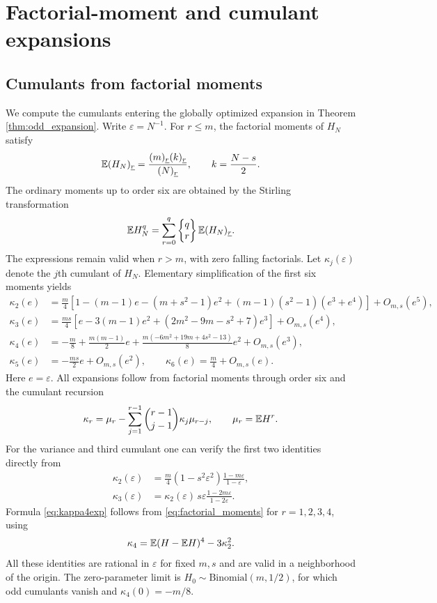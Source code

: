 \section{Factorial-moment and cumulant expansions}\label{app:cumulants}
\subsection{Cumulants from factorial moments}\label{sec:cumulants_odd}
We compute the cumulants entering the globally optimized expansion in Theorem \ref{thm:odd_expansion}. Write $\varepsilon=N^{-1}$. For $r\le m$, the factorial moments of $H_N$ satisfy
\begin{equation}\label{eq:factorial_moments}
 \mathbb E(H_N)_{\underline r}
 =\frac{(m)_{\underline r}(k)_{\underline r}}
 {(N)_{\underline r}},\qquad k=\frac{N-s}{2}.
\end{equation}
The ordinary moments up to order six are obtained by the Stirling transformation
\[
 \mathbb E H_N^q=\sum_{r=0}^q\left\{\begin{matrix}q\\r\end{matrix}\right\}
 \mathbb E(H_N)_{\underline r}.
\]
The expressions remain valid when $r>m$, with zero falling factorials. Let $\kappa_j(\varepsilon)$ denote the $j$th cumulant of $H_N$. Elementary simplification of the first six moments yields
\begin{align}
 \kappa_2(e)&=\frac m4\left[1-(m-1)e-(m+s^2-1)e^2
 +(m-1)(s^2-1)(e^3+e^4)\right]+O_{m,s}(e^5),\label{eq:kappa2exp}\\
 \kappa_3(e)&=\frac{ms}{4}\left[e-3(m-1)e^2
 +(2m^2-9m-s^2+7)e^3\right]+O_{m,s}(e^4),\label{eq:kappa3exp}\\
 \kappa_4(e)&=-\frac m8+\frac{m(m-1)}2e
 +\frac{m(-6m^2+19m+4s^2-13)}8e^2+O_{m,s}(e^3),\label{eq:kappa4exp}\\
 \kappa_5(e)&=-\frac{ms}{2}e+O_{m,s}(e^2),\qquad
 \kappa_6(e)=\frac m4+O_{m,s}(e).\label{eq:kappa56exp}
\end{align}
Here $e=\varepsilon$. All expansions follow from factorial moments through order six and the cumulant recursion
\[
 \kappa_r=\mu_r-\sum_{j=1}^{r-1}\binom{r-1}{j-1}\kappa_j\mu_{r-j},
 \qquad \mu_r=\mathbb E H^r.
\]
For the variance and third cumulant one can verify the first two identities directly from
\begin{align}
 \kappa_2(\varepsilon)
 &=\frac m4(1-s^2\varepsilon^2)\frac{1-m\varepsilon}{1-\varepsilon},\label{eq:exactk2}\\
 \kappa_3(\varepsilon)
 &=\kappa_2(\varepsilon)\,s\varepsilon
 \frac{1-2m\varepsilon}{1-2\varepsilon}.
 \label{eq:exactk3}
\end{align}
Formula \eqref{eq:kappa4exp} follows from \eqref{eq:factorial_moments} for $r=1,2,3,4$, using
\[
 \kappa_4=\mathbb E(H-\mathbb E H)^4-3\kappa_2^2.
\]
All these identities are rational in $\varepsilon$ for fixed $m,s$ and are valid in a neighborhood of the origin. The zero-parameter limit is $H_0\sim\mathrm{Binomial}(m,1/2)$, for which odd cumulants vanish and $\kappa_4(0)=-m/8$.
